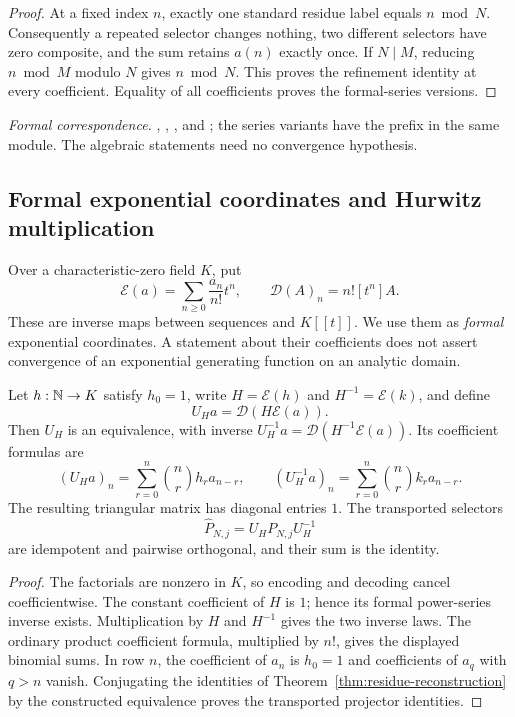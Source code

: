 \begin{proof}
At a fixed index $n$, exactly one standard residue label equals $n\bmod N$.
Consequently a repeated selector changes nothing, two different selectors have
zero composite, and the sum retains $a(n)$ exactly once. If $N\mid M$, reducing
$n\bmod M$ modulo $N$ gives $n\bmod N$. This proves the refinement identity
at every coefficient. Equality of all coefficients proves the formal-series
versions.
\end{proof}

\begingroup\small\raggedright
\noindent\emph{Formal correspondence.}
,
,
, and
; the series variants have the
prefix  in the same module.
The algebraic statements need no convergence hypothesis.
\par\endgroup

\subsection{Formal exponential coordinates and Hurwitz multiplication}

Over a characteristic-zero field $K$, put
\[
\mathcal E(a)=\sum_{n\geq0}\frac{a_n}{n!}t^n,
\qquad \mathcal D(A)_n=n![t^n]A.
\]
These are inverse maps between sequences and $K[[t]]$. We use them as
\emph{formal} exponential coordinates. A statement about their coefficients
does not assert convergence of an exponential generating function on an
analytic domain.

\begin{theorem}
\label{thm:egf-coordinates}
Let $h:\mathbb N\to K$ satisfy $h_0=1$, write $H=\mathcal E(h)$ and
$H^{-1}=\mathcal E(k)$, and define
\[
U_Ha=\mathcal D(H\mathcal E(a)).
\]
Then $U_H$ is an equivalence, with inverse
$U_H^{-1}a=\mathcal D(H^{-1}\mathcal E(a))$. Its coefficient formulas are
\[
(U_Ha)_n=\sum_{r=0}^{n}\binom nr h_r a_{n-r},\qquad
(U_H^{-1}a)_n=\sum_{r=0}^{n}\binom nr k_r a_{n-r}.
\]
The resulting triangular matrix has diagonal entries $1$. The transported
selectors
\[
\widehat P_{N,j}=U_HP_{N,j}U_H^{-1}
\]
are idempotent and pairwise orthogonal, and their sum is the identity.
\end{theorem}

\begin{proof}
The factorials are nonzero in $K$, so encoding and decoding cancel
coefficientwise. The constant coefficient of $H$ is $1$; hence its formal
power-series inverse exists. Multiplication by $H$ and $H^{-1}$ gives the two
inverse laws. The ordinary product coefficient formula, multiplied by $n!$,
gives the displayed binomial sums. In row $n$, the coefficient of $a_n$ is
$h_0=1$ and coefficients of $a_q$ with $q>n$ vanish. Conjugating the identities
of Theorem~\ref{thm:residue-reconstruction} by the constructed equivalence proves
the transported projector identities.
\end{proof}

